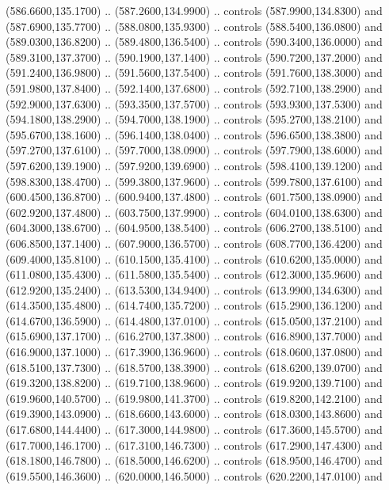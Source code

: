 {\begin{scope}[y=0.80pt, x=0.80pt, yscale=-1, xscale=1, inner sep=0pt, outer sep=0pt, #1]
      (586.6600,135.1700) .. (587.2600,134.9900) .. controls (587.9900,134.8300) and
      (587.6900,135.7700) .. (588.0800,135.9300) .. controls (588.5400,136.0800) and
      (589.0300,136.8200) .. (589.4800,136.5400) .. controls (590.3400,136.0000) and
      (589.3100,137.3700) .. (590.1900,137.1400) .. controls (590.7200,137.2000) and
      (591.2400,136.9800) .. (591.5600,137.5400) .. controls (591.7600,138.3000) and
      (591.9800,137.8400) .. (592.1400,137.6800) .. controls (592.7100,138.2900) and
      (592.9000,137.6300) .. (593.3500,137.5700) .. controls (593.9300,137.5300) and
      (594.1800,138.2900) .. (594.7000,138.1900) .. controls (595.2700,138.2100) and
      (595.6700,138.1600) .. (596.1400,138.0400) .. controls (596.6500,138.3800) and
      (597.2700,137.6100) .. (597.7000,138.0900) .. controls (597.7900,138.6000) and
      (597.6200,139.1900) .. (597.9200,139.6900) .. controls (598.4100,139.1200) and
      (598.8300,138.4700) .. (599.3800,137.9600) .. controls (599.7800,137.6100) and
      (600.4500,136.8700) .. (600.9400,137.4800) .. controls (601.7500,138.0900) and
      (602.9200,137.4800) .. (603.7500,137.9900) .. controls (604.0100,138.6300) and
      (604.3000,138.6700) .. (604.9500,138.5400) .. controls (606.2700,138.5100) and
      (606.8500,137.1400) .. (607.9000,136.5700) .. controls (608.7700,136.4200) and
      (609.4000,135.8100) .. (610.1500,135.4100) .. controls (610.6200,135.0000) and
      (611.0800,135.4300) .. (611.5800,135.5400) .. controls (612.3000,135.9600) and
      (612.9200,135.2400) .. (613.5300,134.9400) .. controls (613.9900,134.6300) and
      (614.3500,135.4800) .. (614.7400,135.7200) .. controls (615.2900,136.1200) and
      (614.6700,136.5900) .. (614.4800,137.0100) .. controls (615.0500,137.2100) and
      (615.6900,137.1700) .. (616.2700,137.3800) .. controls (616.8900,137.7000) and
      (616.9000,137.1000) .. (617.3900,136.9600) .. controls (618.0600,137.0800) and
      (618.5100,137.7300) .. (618.5700,138.3900) .. controls (618.6200,139.0700) and
      (619.3200,138.8200) .. (619.7100,138.9600) .. controls (619.9200,139.7100) and
      (619.9600,140.5700) .. (619.9800,141.3700) .. controls (619.8200,142.2100) and
      (619.3900,143.0900) .. (618.6600,143.6000) .. controls (618.0300,143.8600) and
      (617.6800,144.4400) .. (617.3000,144.9800) .. controls (617.3600,145.5700) and
      (617.7000,146.1700) .. (617.3100,146.7300) .. controls (617.2900,147.4300) and
      (618.1800,146.7800) .. (618.5000,146.6200) .. controls (618.9500,146.4700) and
      (619.5500,146.3600) .. (620.0000,146.5000) .. controls (620.2200,147.0100) and

\end{scope}}
